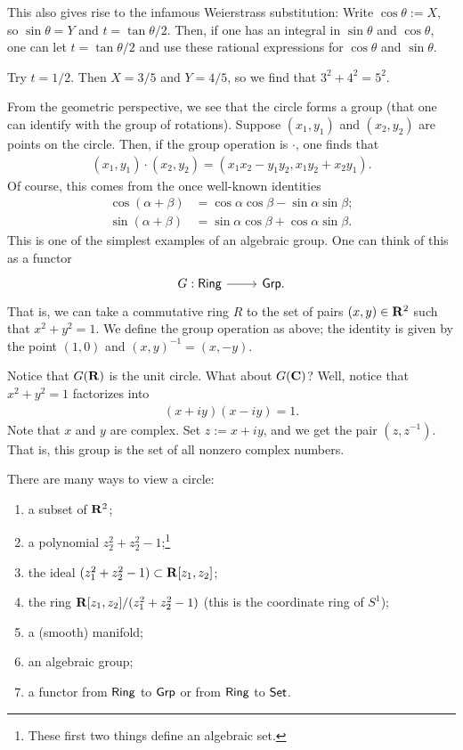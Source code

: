 \documentclass [11 pt, oneside] {article}
\begin{document}
This also gives rise to the infamous Weierstrass substitution: Write $\cos \theta := X$, so $\sin \theta = Y$ and $t= \tan \theta/2$. Then, if one has an integral in $\sin \theta$ and $\cos \theta$, one can let $t = \tan\theta/2$ and use these rational expressions for $\cos\theta$ and $\sin \theta$.

Try $t=1/2$. Then $X=3/5$ and $Y=4/5$, so we find that $3^2 + 4^2 = 5^2$.

From the geometric perspective, we see that the circle forms a group (that one can identify with the group of rotations). Suppose $(x_1,y_1)$ and $(x_2,y_2)$ are points on the circle. Then, if the group operation is $\cdot$, one finds that
\begin{align*}
	(x_1,y_1) \cdot (x_2,y_2) = (x_1x_2-y_1y_2, x_1y_2+x_2y_1).
\end{align*}
Of course, this comes from the once well-known identities
\begin{align*}
	\cos(\alpha+\beta) &=\cos\alpha \cos\beta- \sin \alpha \sin \beta;\\
	\sin(\alpha + \beta) &= \sin\alpha \cos\beta + \cos \alpha \sin \beta.
\end{align*}
This is one of the simplest examples of an algebraic group. One can think of this as a functor
\[
\begin{tikzcd}
	G : \catn{Ring} \ar[r]& \catn{Grp}.
\end{tikzcd}
\]
That is, we can take a commutative ring $R$ to the set of pairs $(x,y)\in \mathbf R^2$ such that $x^2+y^2=1$. We define the group operation as above; the identity is given by the point $(1,0)$ and $(x,y) ^{-1} = (x,-y)$.

Notice that $G(\mathbf R)$ is the unit circle. What about $G(\mathbf C)$? Well, notice that $x^2+y^2 =1$ factorizes into
\begin{align*}
	(x+iy) (x-iy) = 1.
\end{align*}
Note that $x$ and $y$ are complex. Set $z := x+iy$, and we get the pair $(z,z^{-1})$. That is, this group is the set of all nonzero complex numbers.

There are many ways to view a circle:
\begin{enumerate}
	\item a subset of $\mathbf R^2$;
	\item a polynomial $z_2^2 + z_2^2 -1$;\footnote{These first two things define an algebraic set.}
	\item the ideal $(z_1^2+z_2^2-1)\subset \mathbf R[z_1,z_2]$;
	\item the ring $\mathbf R[z_1,z_2] / (z_1^2+z_2^2-1)$ (this is the coordinate ring of $S^1$);
	\item a (smooth) manifold;
	\item an algebraic group;
	\item a functor from $\textsf{Ring}$ to $\textsf{Grp}$ or from $\textsf{Ring}$ to $\textsf{Set}$.
\end{enumerate}
\end{document}
